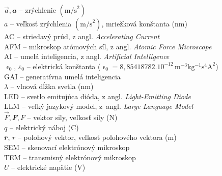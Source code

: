 \chapter*{\FEIlistOfSymbolsAndAbbreviationsString}
{
  \linespread{1.7}\selectfont

  $\vec{a}, \mathbfit{a}$ -- zrýchlenie $(\mathrm{m/s}^2)$\\
  $a$ -- veľkosť zrýchlenia $(\mathrm{m/s}^2)$, mriežková konštanta (nm)\\
  AC -- striedavý prúd, z angl. \emph{\foreignlanguage{english}{Accelerating Current}}\\
  AFM -- mikroskop atómových síl, z angl. \emph{\foreignlanguage{english}{Atomic Force Microscope}}\\
  AI -- umelá inteligencia, z angl. \emph{\foreignlanguage{english}{Artificial Intelligence}}\\
  $\upvarepsilon_0$, $\varepsilon_0$ -- elektrická konštanta ($\upvarepsilon_0 = 8{,}85418782\mathbin.10^{-12}\,\mathrm{m^{-3} kg^{-1} s^4 A^2}$)\\
  GAI -- generatívna umelá inteligencia\\
  $\lambda$ -- vlnová dĺžka svetla (nm)\\
  LED -- svetlo emitujúca dióda, z angl. \emph{\foreignlanguage{english}{Light-Emitting Diode}}\\
  LLM -- veľký jazykový model, z~angl. \emph{\foreignlanguage{english}{Large Language Model}}\\
  $\vec{F}, \mathbfit{F}, F$ – vektor sily, veľkosť sily (N)\\
  $q$ -- elektrický náboj (C)\\
  $\mathbfit r$, $r$ -- polohový vektor, veľkosť polohového vektora (m)\\
  SEM -- skenovací elektrónový mikroskop\\
  TEM -- transmisný elektrónový mikroskop\\
  $U$ -- elektrické napätie (V)

  \par
}
\newpage
